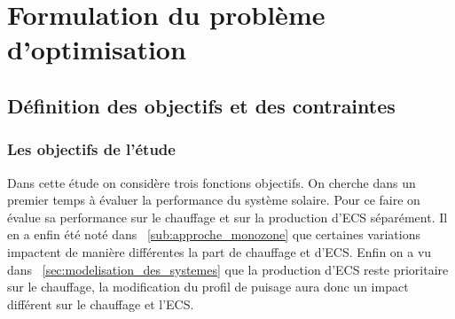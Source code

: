 


\section{Formulation du problème d’optimisation} %
\label{sec:formulation_du_probleme_d_optimisation}
\subsection{Définition des objectifs et des contraintes} %
\label{sub:definition_des_objectifs_et_des_contraintes}

\subsubsection{Les objectifs de l’étude} %
\label{ssub:les_objectifs_de_l_etude}
Dans cette étude on considère trois fonctions objectifs. On cherche dans un premier
temps à évaluer la performance du système solaire. Pour ce faire on évalue sa
performance sur le chauffage et sur la production d’ECS séparément. Il en a enfin
été noté dans ~\autoref{sub:approche_monozone} que certaines variations impactent
de manière différentes la part de chauffage et d’ECS. Enfin on a vu dans
~\autoref{sec:modelisation_des_systemes} que la production d’ECS reste prioritaire
sur le chauffage, la modification du profil de puisage aura donc un impact différent
sur le chauffage et l’ECS.

